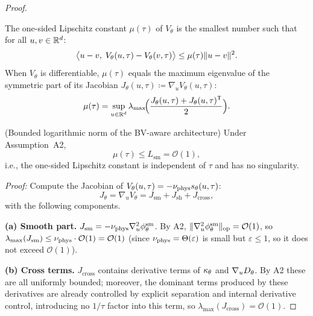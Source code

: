 \begin{proof}
\begin{definition}
The one-sided Lipschitz constant $\mu(\tau)$ of $V_\theta$ is the smallest number such that for all $u, v \in \mathbb{R}^d$:
\begin{equation}
  \bigl\langle u - v,\; V_\theta(u,\tau) - V_\theta(v,\tau) \bigr\rangle \leq \mu(\tau) \lVert u - v \rVert^2.
\end{equation}
When $V_\theta$ is differentiable, $\mu(\tau)$ equals the maximum eigenvalue of the symmetric part of its Jacobian $J_\theta(u,\tau) \coloneqq \nabla_u V_\theta(u,\tau)$:
\begin{equation}
  \mu(\tau) = \sup_{u \in \mathbb{R}^d} \lambda_{\max}\!\Bigl(\frac{J_\theta(u,\tau) + J_\theta(u,\tau)^\mathsf{T}}{2}\Bigr).
\end{equation}
\end{definition}

\begin{lemma}\label{lem:2.1}
(Bounded logarithmic norm of the BV-aware architecture) Under Assumption~A2,
\begin{equation}
  \mu(\tau) \leq L_{\mathrm{sm}} = \mathcal{O}(1),
\end{equation}
i.e., the one-sided Lipschitz constant is independent of $\tau$ and has no singularity.
\end{lemma}

\textit{Proof:} Compute the Jacobian of $V_\theta(u,\tau) = -\nu_{\mathrm{phys}} s_{\theta}(u,\tau)$:
\begin{equation}
  J_\theta = \nabla_u V_\theta = J_{\mathrm{sm}} + J_{\mathrm{sh}} + J_{\mathrm{cross}},
\end{equation}
with the following components.

\textbf{(a) Smooth part.} $J_{\mathrm{sm}} = -\nu_{\mathrm{phys}} \nabla_u^2 \phi^{\mathrm{sm}}_{\theta}$. By A2, $\lVert \nabla_u^2 \phi^{\mathrm{sm}}_{\theta} \rVert_{\mathrm{op}} = \mathcal{O}(1)$, so $\lambda_{\max}(J_{\mathrm{sm}}) \leq \nu_{\mathrm{phys}} \cdot \mathcal{O}(1) = \mathcal{O}(1)$ (since $\nu_{\mathrm{phys}} = \Theta(\varepsilon)$ is small but $\varepsilon \leq 1$, so it does not exceed $\mathcal{O}(1)$).

\textbf{(b) Cross terms.} $J_{\mathrm{cross}}$ contains derivative terms of $\kappa_{\theta}$ and $\nabla_u D_{\theta}$. By A2 these are all uniformly bounded; moreover, the dominant terms produced by these derivatives are already controlled by explicit separation and internal derivative control, introducing no $1/\tau$ factor into this term, so $\lambda_{\max}(J_{\mathrm{cross}}) = \mathcal{O}(1)$.


\end{proof}
